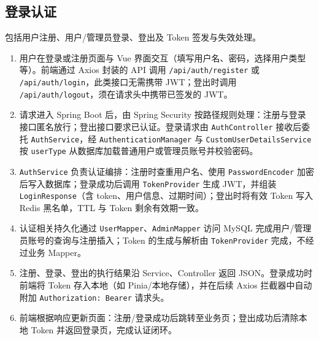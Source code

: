 %   
%   

\subsection{登录认证}

包括用户注册、用户/管理员登录、登出及 Token 签发与失效处理。

\begin{enumerate}
    \item 用户在登录或注册页面与 Vue 界面交互（填写用户名、密码，选择用户类型等）。前端通过 Axios 封装的 API 调用 \texttt{/api/auth/register} 或 \texttt{/api/auth/login}，此类接口无需携带 JWT；登出时调用 \texttt{/api/auth/logout}，须在请求头中携带已签发的 JWT。

    \item 请求进入 Spring Boot 后，由 Spring Security 按路径规则处理：注册与登录接口匿名放行；登出接口要求已认证。登录请求由 \texttt{AuthController} 接收后委托 \texttt{AuthService}，经 \texttt{AuthenticationManager} 与 \texttt{CustomUserDetailsService} 按 \texttt{userType} 从数据库加载普通用户或管理员账号并校验密码。

    \item \texttt{AuthService} 负责认证编排：注册时查重用户名、使用 \texttt{PasswordEncoder} 加密后写入数据库；登录成功后调用 \texttt{TokenProvider} 生成 JWT，并组装 \texttt{LoginResponse}（含 token、用户信息、过期时间）；登出时将有效 Token 写入 Redis 黑名单，TTL 与 Token 剩余有效期一致。

    \item 认证相关持久化通过 \texttt{UserMapper}、\texttt{AdminMapper} 访问 MySQL 完成用户/管理员账号的查询与注册插入；Token 的生成与解析由 \texttt{TokenProvider} 完成，不经过业务 Mapper。

    \item 注册、登录、登出的执行结果沿 Service、Controller 返回 JSON。登录成功时前端将 Token 存入本地（如 Pinia/本地存储），并在后续 Axios 拦截器中自动附加 \texttt{Authorization: Bearer} 请求头。

    \item 前端根据响应更新页面：注册/登录成功后跳转至业务页；登出成功后清除本地 Token 并返回登录页，完成认证闭环。
\end{enumerate}


